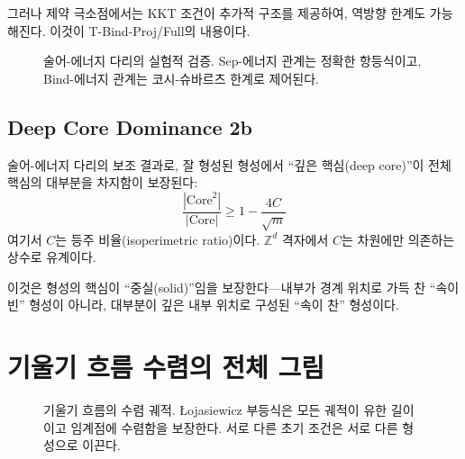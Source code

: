 그러나 제약 극소점에서는 KKT 조건이 추가적 구조를 제공하여, 역방향 한계도 가능해진다. 이것이 T-Bind-Proj/Full의 내용이다.

\begin{figure}[t]
\centering
\caption{술어-에너지 다리의 실험적 검증. Sep-에너지 관계는 정확한 항등식이고, Bind-에너지 관계는 코시-슈바르츠 한계로 제어된다.}
\label{fig:predicate-energy}
\end{figure}

\subsection{Deep Core Dominance 2b}

술어-에너지 다리의 보조 결과로, 잘 형성된 형성에서 ``깊은 핵심(deep core)''이 전체 핵심의 대부분을 차지함이 보장된다:
\begin{equation}
    \frac{|\mathrm{Core}^2|}{|\mathrm{Core}|} \geq 1 - \frac{4C}{\sqrt{m}}
\end{equation}
여기서 $C$는 등주 비율(isoperimetric ratio)이다. $\mathbb{Z}^d$ 격자에서 $C$는 차원에만 의존하는 상수로 유계이다.

이것은 형성의 핵심이 ``중실(solid)''임을 보장한다---내부가 경계 위치로 가득 찬 ``속이 빈'' 형성이 아니라, 대부분이 깊은 내부 위치로 구성된 ``속이 찬'' 형성이다.


\section{기울기 흐름 수렴의 전체 그림}
\label{sec:convergence-summary}

\begin{figure}[t]
\centering
\caption{기울기 흐름의 수렴 궤적. \L{}ojasiewicz 부등식은 모든 궤적이 유한 길이이고 임계점에 수렴함을 보장한다. 서로 다른 초기 조건은 서로 다른 형성으로 이끈다.}
\label{fig:convergence-trajectories}
\end{figure}

